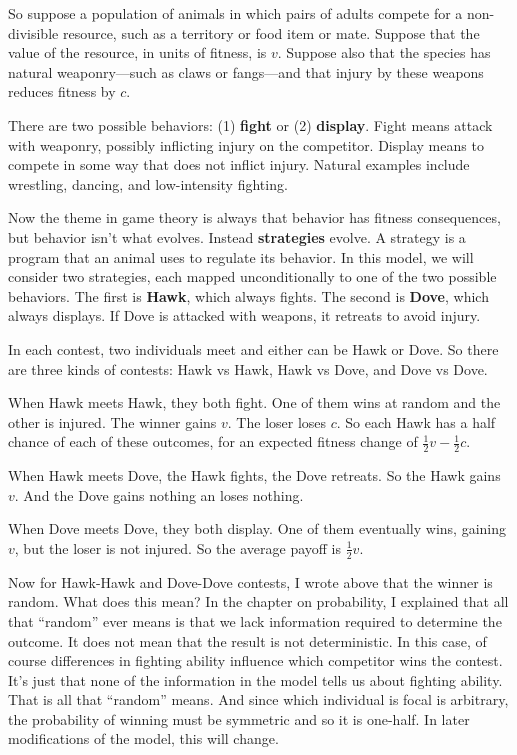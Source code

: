 \documentclass[10pt,reqno]{amsbook}
\newcommand{\bemph}[1]{{\textbf{\textcolor{bemphcol}{#1}}}}
\numberwithin{equation}{chapter}
\begin{document}
So suppose a population of animals in which pairs of adults compete for a non-divisible resource, such as a territory or food item or mate. Suppose that the value of the resource, in units of fitness, is $v$. Suppose also that the species has natural weaponry---such as claws or fangs---and that injury by these weapons reduces fitness by $c$. 

There are two possible behaviors: (1) \bemph{fight} or (2) \bemph{display}. Fight means attack with weaponry, possibly inflicting injury on the competitor. Display means to compete in some way that does not inflict injury. Natural examples include wrestling, dancing, and low-intensity fighting.

Now the theme in game theory is always that behavior has fitness consequences, but behavior isn't what evolves. Instead \bemph{strategies} evolve. A strategy is a program that an animal uses to regulate its behavior. In this model, we will consider two strategies, each mapped unconditionally to one of the two possible behaviors. The first is \bemph{Hawk}, which always fights. The second is \bemph{Dove}, which always displays. If Dove is attacked with weapons, it retreats to avoid injury. 

In each contest, two individuals meet and either can be Hawk or Dove. So there are three kinds of contests: Hawk vs Hawk, Hawk vs Dove, and Dove vs Dove. 

When Hawk meets Hawk, they both fight. One of them wins at random and the other is injured. The winner gains $v$. The loser loses $c$. So each Hawk has a half chance of each of these outcomes, for an expected fitness change of $\tfrac{1}{2}v-\tfrac{1}{2}c$.

When Hawk meets Dove, the Hawk fights, the Dove retreats. So the Hawk gains $v$. And the Dove gains nothing an loses nothing.

When Dove meets Dove, they both display. One of them eventually wins, gaining $v$, but the loser is not injured. So the average payoff is $\tfrac{1}{2}v$.

Now for Hawk-Hawk and Dove-Dove contests, I wrote above that the winner is random. What does this mean? In the chapter on probability, I explained that all that ``random'' ever means is that we lack information required to determine the outcome. It does not mean that the result is not deterministic. In this case, of course differences in fighting ability influence which competitor wins the contest. It's just that none of the information in the model tells us about fighting ability. That is all that ``random'' means. And since which individual is focal is arbitrary, the probability of winning must be symmetric and so it is one-half. In later modifications of the model, this will change.
\end{document}
